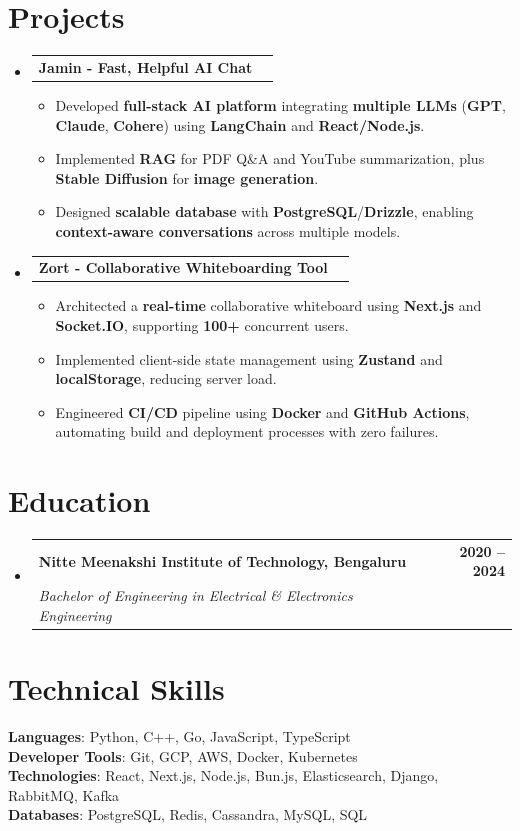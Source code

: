 \documentclass[letterpaper,11pt]{article}
\makeatletter
\newcommand{\resumeItem}[1]{
  \item\small{
    {#1 \vspace{-2pt}}
  }
}
\newcommand{\resumeSubheading}[4]{
  \vspace{-2pt}\item
    \begin{tabular*}{1.0\textwidth}[t]{l@{\extracolsep{\fill}}r}
      \textbf{#1} & \textbf{\small #2} \\ 
      \textit{\small#3} & \textit{\small #4} \\
    \end{tabular*}\vspace{-7pt}
}
\newcommand{\resumeProjectHeadingWithLinks}[3]{
    \item
    \begin{tabular*}{1.001\textwidth}{l@{\extracolsep{\fill}}r}
      \small\textbf{#1}\\
    \end{tabular*}\vspace{-7pt}
}
\newcommand{\resumeSubHeadingListStart}{\begin{itemize}[leftmargin=0.0in, label={}]}
\newcommand{\resumeSubHeadingListEnd}{\end{itemize}}
\newcommand{\resumeItemListStart}{\begin{itemize}}
\newcommand{\resumeItemListEnd}{\end{itemize}\vspace{-5pt}}
\makeatother
\begin{document}
\section{Projects}
\vspace{-10pt}
  \resumeSubHeadingListStart 
  \resumeProjectHeadingWithLinks 
    {\textbf{Jamin - Fast, Helpful AI Chat}}
    {} {} 
    \vspace{-8pt}
    \resumeItemListStart
      \resumeItem{Developed \textbf{full-stack AI platform} integrating \textbf{multiple LLMs} (\textbf{GPT}, \textbf{Claude}, \textbf{Cohere}) using \textbf{LangChain} and \textbf{React/Node.js}.} 
      \resumeItem{Implemented \textbf{RAG} for PDF Q\&A and YouTube summarization, plus \textbf{Stable Diffusion} for \textbf{image generation}.} 
      \resumeItem{Designed \textbf{scalable database} with \textbf{PostgreSQL}/\textbf{Drizzle}, enabling \textbf{context-aware conversations} across multiple models.} 
    \resumeItemListEnd 
    \vspace{-10pt}
  \resumeProjectHeadingWithLinks 
    {Zort - Collaborative Whiteboarding Tool}
    {} {}
    \vspace{-8pt}
    \resumeItemListStart 
      \resumeItem{Architected a \textbf{real-time} collaborative whiteboard using \textbf{Next.js} and \textbf{Socket.IO}, supporting \textbf{100+} concurrent users.} 
      \resumeItem{Implemented client-side state management using \textbf{Zustand} and \textbf{localStorage}, reducing server load.} 
      \resumeItem{Engineered \textbf{CI/CD} pipeline using \textbf{Docker} and \textbf{GitHub Actions}, automating build and deployment processes with zero failures.}
    \resumeItemListEnd 
    \resumeSubHeadingListEnd

\section{Education}
  \resumeSubHeadingListStart
    \resumeSubheading
      {Nitte Meenakshi Institute of Technology, Bengaluru}{2020 -- 2024}
      {Bachelor of Engineering in Electrical \& Electronics Engineering}{}
  \resumeSubHeadingListEnd


\section{Technical Skills}
 \begin{itemize}[leftmargin=0.15in, label={}, itemsep=-5pt]
    \small{\item{
     \textbf{Languages}{: Python, C++, Go, JavaScript, TypeScript} \\
     \textbf{Developer Tools}{: Git, GCP, AWS, Docker, Kubernetes} \\
     \textbf{Technologies}{: React, Next.js, Node.js, Bun.js, Elasticsearch, Django, RabbitMQ, Kafka}  \\
     \textbf{Databases}{: PostgreSQL, Redis, Cassandra, MySQL, SQL}
    }}
    \vspace{-5pt}
 \end{itemize}
\end{document}

